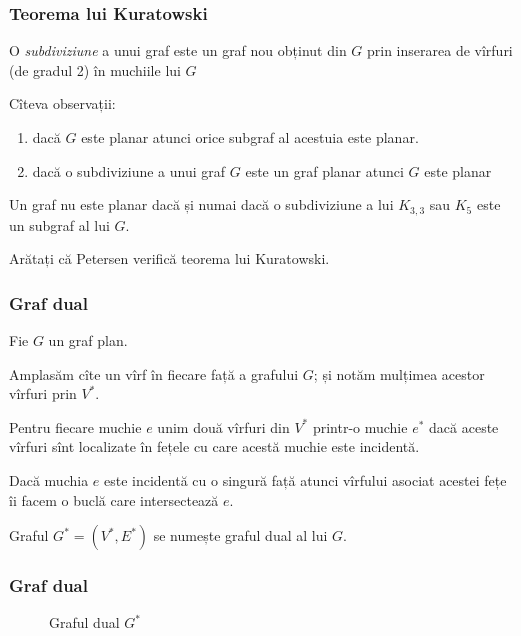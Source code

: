 \begin{frame}
  \frametitle{Teorema lui Kuratowski}
 

\begin{definition}
O \emph{subdiviziune} a unui graf este un graf nou obținut din $G$ prin 
inserarea de vîrfuri (de gradul 2) în muchiile lui $G$
\end{definition}

Cîteva observații:
\begin{enumerate}
 \item dacă $G$ este planar atunci orice subgraf al acestuia este planar.
 
 \item dacă o subdiviziune a unui graf $G$ este un graf planar atunci $G$ este 
 planar
\end{enumerate}

\begin{theorem}[Kuratowski]
Un graf nu este planar dacă și numai dacă o subdiviziune a lui $K_{3,3}$ sau 
$K_5$ este un subgraf al lui $G$.
\end{theorem}


Arătați că Petersen verifică teorema lui Kuratowski.


\end{frame}


\begin{frame}
  \frametitle{Graf dual}

Fie $G$ un graf plan. 

Amplasăm cîte un vîrf în fiecare față a grafului $G$; și notăm mulțimea acestor vîrfuri prin $V^*$.

Pentru fiecare muchie $e$ unim două vîrfuri din $V^*$ printr-o muchie $e^*$ dacă aceste vîrfuri sînt localizate în fețele cu care acestă muchie este incidentă.

Dacă muchia $e$ este incidentă cu o singură față atunci vîrfului asociat acestei fețe îi facem o buclă care intersectează $e$.

Graful $G^*=(V^*,E^*)$ se numește graful dual al lui $G$. 

\end{frame}

\begin{frame}
  \frametitle{Graf dual}

\begin{figure}
\centering%
\caption{Graful dual $G^*$}
\end{figure}
\end{frame}

